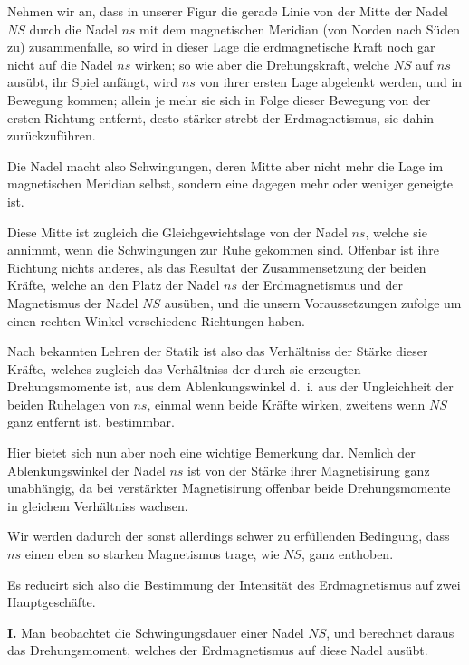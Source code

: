 \documentclass[12pt,a4paper]{article}
\begin{document}
Nehmen wir an, dass in unserer Figur die gerade Linie von der Mitte der Nadel $NS$ durch die Nadel $ns$ mit dem magnetischen Meridian (von Norden nach Süden zu) zusammenfalle, so wird in dieser Lage die erdmagnetische Kraft noch gar nicht auf die Nadel $ns$ wirken; so wie aber die Drehungskraft, welche $NS$ auf $ns$ ausübt, ihr Spiel anfängt, wird $ns$ von ihrer ersten Lage abgelenkt werden, und in Bewegung kommen; allein je mehr sie sich in Folge dieser Bewegung von der ersten Richtung entfernt, desto stärker strebt der Erdmagnetismus, sie dahin zurückzuführen.

Die Nadel macht also Schwingungen, deren Mitte aber nicht mehr die Lage im magnetischen Meridian selbst, sondern eine dagegen mehr oder weniger geneigte ist.

Diese Mitte ist zugleich die Gleichgewichtslage von der Nadel $ns$, welche sie annimmt, wenn die Schwingungen zur Ruhe gekommen sind. Offenbar ist ihre Richtung nichts anderes, als das Resultat der Zusammensetzung der beiden Kräfte, welche an den Platz der Nadel $ns$ der Erdmagnetismus und der Magnetismus der Nadel $NS$ ausüben, und die unsern Voraussetzungen zufolge um einen rechten Winkel verschiedene Richtungen haben.

Nach bekannten Lehren der Statik ist also das Verhältniss der Stärke dieser Kräfte, welches zugleich das Verhältniss der durch sie erzeugten Drehungsmomente ist, aus dem Ablenkungswinkel d.~i. aus der Ungleichheit der beiden Ruhelagen von $ns$, einmal wenn beide Kräfte wirken, zweitens wenn $NS$ ganz entfernt ist, bestimmbar.

Hier bietet sich nun aber noch eine wichtige Bemerkung dar. Nemlich der Ablenkungswinkel der Nadel $ns$ ist von der Stärke ihrer Magnetisirung ganz unabhängig, da bei verstärkter Magnetisirung offenbar beide Drehungsmomente in gleichem Verhältniss wachsen.

Wir werden dadurch der sonst allerdings schwer zu erfüllenden Bedingung, dass $ns$ einen eben so starken Magnetismus trage, wie $NS$, ganz enthoben.

\bigskip

Es reducirt sich also die Bestimmung der Intensität des Erdmagnetismus auf zwei Hauptgeschäfte.

\textbf{I.} Man beobachtet die Schwingungsdauer einer Nadel $NS$, und berechnet daraus das Drehungsmoment, welches der Erdmagnetismus auf diese Nadel ausübt.
\end{document}
